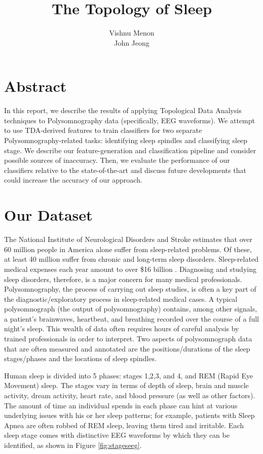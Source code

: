 \documentclass[11pt]{article}
\title{\textbf{The Topology of Sleep}}
\author{Vishnu Menon\\  
		John Jeong}
\date{}
\begin{document}
\maketitle

\section{Abstract}
In this report, we describe the results of applying Topological Data Analysis techniques to Polysomnography data (specifically, EEG waveforms). We attempt to use TDA-derived features to train classifiers for two separate Polysomnography-related tasks: identifying sleep spindles and classifying sleep stage. We describe our feature-generation and classification pipeline and consider possible sources of inaccuracy. Then, we evaluate the performance of our classifiers relative to the state-of-the-art and discuss future developments that could increase the accuracy of our approach.
  

\section{Our Dataset}
The National Institute of Neurological Disorders and Stroke estimates that over 60 million people in America alone suffer from sleep-related problems. Of these, at least 40 million suffer from chronic and long-term sleep disorders. Sleep-related medical expenses each year amount to over \$16 billion \cite{ninds}. Diagnosing and studying sleep disorders, therefore, is a major concern for many medical professionals. Polysomnography, the process of carrying out sleep studies, is often a key part of the diagnostic/exploratory process in sleep-related medical cases. A typical polysomnograph (the output of polysomnography) contains, among other signals, a patient's brainwaves, heartbeat, and breathing recorded over the course of a full night's sleep. This wealth of data often requires hours of careful analysis by trained professionals in order to interpret. Two aspects of polysomnograph data that are often measured and annotated are the positions/durations of the sleep stages/phases and the  locations of sleep spindles. 

Human sleep is divided into 5 phases: stages 1,2,3, and 4, and REM (Rapid Eye Movement) sleep. The stages vary in terms of depth of sleep, brain and muscle activity, dream activity, heart rate, and blood pressure (as well as other factors). The amount of time an individual spends in each phase can hint at various underlying issues with his or her sleep patterns; for example, patients with Sleep Apnea are often robbed of REM sleep, leaving them tired and irritable. Each sleep stage comes with distinctive EEG waveforms by which they can be identified, as shown in Figure \ref{fig:stageseeg}.
\end{document}
